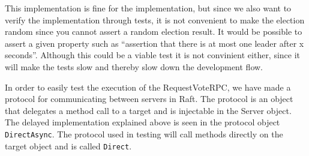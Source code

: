 This implementation is fine for the implementation, but since we also want to verify the implementation through tests, it is not convenient to make the election random since you cannot assert a random election result. It would be possible to assert a given property such as ``assertion that there is at most one leader after x seconds''. Although this could be a viable test it is not convinient either, since it will make the tests slow and thereby slow down the development flow.

In order to easily test the execution of the RequestVoteRPC, we have made a protocol for communicating between servers in Raft. The protocol is an object that delegates a method call to a target and is injectable in the Server object. The delayed implementation explained above is seen in the protocol object \verb$DirectAsync$. The protocol used in testing will call methods directly on the target object and is called \verb$Direct$.


%

